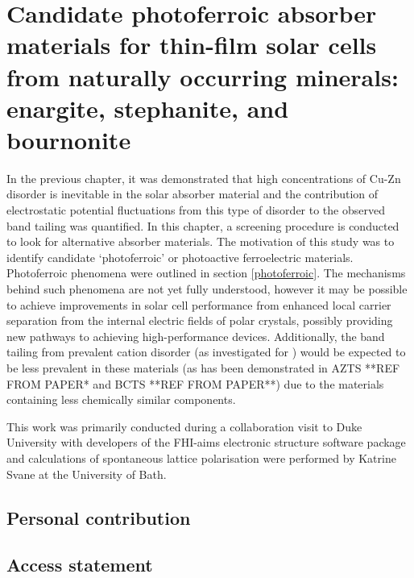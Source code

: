 \documentclass[11pt, twoside]{report}
\begin{document}
\section{Candidate photoferroic absorber materials for thin-film
solar cells from naturally occurring minerals:
enargite, stephanite, and bournonite}


In the previous chapter, it was demonstrated that high concentrations of Cu-Zn disorder is inevitable in the solar absorber material {\CZTS} and the contribution of electrostatic potential fluctuations from this type of disorder to the observed band tailing was quantified. In this chapter, a screening procedure is conducted to look for alternative absorber materials. The motivation of this study was to identify candidate `photoferroic’ or photoactive ferroelectric materials. Photoferroic phenomena were outlined in section \ref{photoferroic}. The mechanisms behind such phenomena are not yet fully understood, however it may be possible to achieve improvements in solar cell performance from enhanced local carrier separation from the internal electric fields of polar crystals, possibly providing new pathways to achieving high-performance devices.
Additionally, the band tailing from prevalent cation disorder (as investigated for {\CZTS}) would be expected to be less prevalent in these materials (as has been demonstrated in AZTS **REF FROM PAPER* and BCTS **REF FROM PAPER**) due to the materials containing less chemically similar components.

This work was primarily conducted during a collaboration visit to Duke University with developers of the FHI-aims \cite{FHI-aims} electronic structure software package and calculations of spontaneous lattice polarisation were performed by Katrine Svane at the University of Bath.





\subsection{Personal contribution}
\subsection{Access statement}
\end{document}

